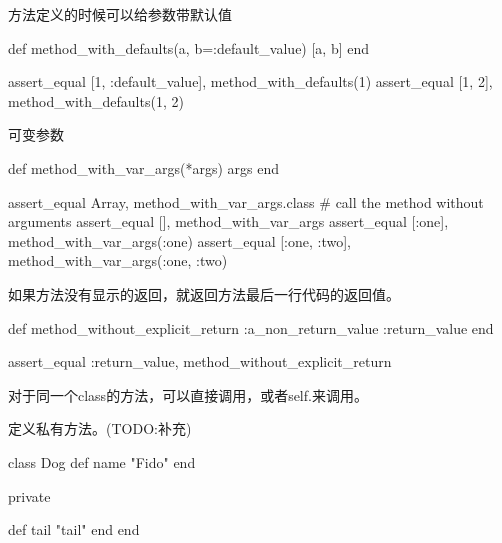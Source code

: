 方法定义的时候可以给参数带默认值
\begin{Ruby}
  	def method_with_defaults(a, b=:default_value)
    	[a, b]
  	end
  
    assert_equal [1, :default_value], method_with_defaults(1)
    assert_equal [1, 2], method_with_defaults(1, 2)
\end{Ruby}

可变参数
\begin{Ruby}
  	def method_with_var_args(*args)
   		args
  	end
  
    assert_equal Array, method_with_var_args.class # call the method without arguments
    assert_equal [], method_with_var_args
    assert_equal [:one], method_with_var_args(:one)
    assert_equal [:one, :two], method_with_var_args(:one, :two)
\end{Ruby}

如果方法没有显示的返回，就返回方法最后一行代码的返回值。
\begin{Ruby}
  	def method_without_explicit_return
    	:a_non_return_value
    	:return_value
  	end
  	
  	assert_equal :return_value, method_without_explicit_return
\end{Ruby}


对于同一个class的方法，可以直接调用，或者self.来调用。

定义私有方法。(TODO:补充)
\begin{Ruby}
  class Dog
    def name
      "Fido"
    end

    private

    def tail
      "tail"
    end
  end
\end{Ruby}



































